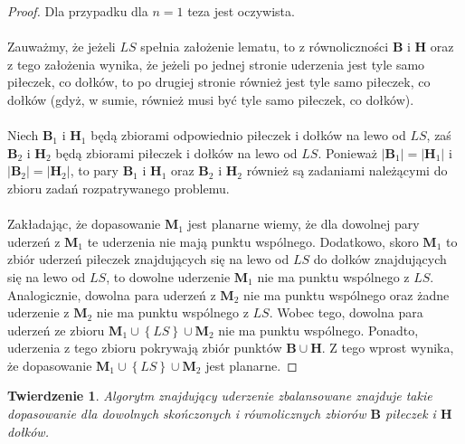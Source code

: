 \documentclass[10pt,a4paper]{article}
\newtheorem{theorem}{Twierdzenie}
\begin{document}
	\begin{proof}
		Dla przypadku dla $n = 1$  teza jest oczywista. \\~\\
		Zauważmy, że jeżeli $LS$ spełnia założenie lematu, to z równoliczności $\mathbf{B}$ i $\mathbf{H}$ oraz z tego założenia wynika, że jeżeli po jednej stronie uderzenia jest tyle samo piłeczek, co dołków, to po drugiej stronie również jest tyle samo piłeczek, co dołków (gdyż, w sumie, również musi być tyle samo piłeczek, co dołków). \\~\\
		Niech $\mathbf{B}_{1}$ i $\mathbf{H}_{1}$ będą zbiorami odpowiednio piłeczek i dołków na lewo od $LS$, zaś $\mathbf{B}_{2}$ i $\mathbf{H}_{2}$ będą zbiorami piłeczek i dołków na lewo od $LS$. Ponieważ $|\mathbf{B}_{1}| = |\mathbf{H}_{1}|$ i $|\mathbf{B}_{2}| = |\mathbf{H}_{2}|$, to pary $\mathbf{B}_{1}$ i $\mathbf{H}_{1}$ oraz $\mathbf{B}_{2}$ i $\mathbf{H}_{2}$ również są zadaniami należącymi do zbioru zadań rozpatrywanego problemu. \\~\\
		Zakładając, że dopasowanie $\mathbf{M}_{1}$ jest planarne wiemy, że dla dowolnej pary uderzeń z $\mathbf{M}_{1}$ te uderzenia nie mają punktu wspólnego. Dodatkowo, skoro $\mathbf{M}_{1}$ to zbiór uderzeń piłeczek znajdujących się na lewo od $LS$ do dołków znajdujących się na lewo od $LS$, to dowolne uderzenie $\mathbf{M}_{1}$ nie ma punktu wspólnego z $LS$. Analogicznie, dowolna para uderzeń z $\mathbf{M}_{2}$ nie ma punktu wspólnego oraz żadne uderzenie z $\mathbf{M}_{2}$ nie ma punktu wspólnego z $LS$. Wobec tego, dowolna para uderzeń ze zbioru $\mathbf{M}_{1} \cup \left\{LS\right\} \cup \mathbf{M}_{2}$ nie ma punktu wspólnego. Ponadto, uderzenia z tego zbioru pokrywają zbiór punktów $\mathbf{B} \cup \mathbf{H}$. Z tego wprost wynika, że dopasowanie $\mathbf{M}_{1} \cup \left\{LS\right\} \cup \mathbf{M}_{2}$	jest planarne.
	\end{proof}

	\begin{theorem} \label{theorem:1}
		Algorytm znajdujący uderzenie zbalansowane znajduje takie dopasowanie dla dowolnych skończonych i równolicznych zbiorów $\mathbf{B}$ piłeczek i $\mathbf{H}$ dołków.
	\end{theorem}
\end{document}
